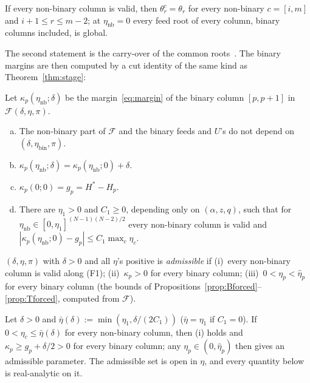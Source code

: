 \documentclass[11pt,a4paper]{report}
\newcommand{\cF}{\mathcal F}
\newcommand{\Hs}{H^{*}}
\begin{document}
\begin{lemma}\label{lem:middle}
If every non-binary column is valid, then \(\theta^c_r=\theta_r\) for every non-binary \(c=[i,m]\) and \(i+1\le r\le m-2\); at
\(\eta_{\mathrm{nb}}=0\) every feed root of every column, binary columns included, is global.
\end{lemma}

The second statement is the carry-over of the common roots~\autocite{CW89,HS2}. The binary margins are then computed by
a cut identity of the same kind as Theorem~\ref{thm:stage}:

\begin{proposition}\label{prop:margins}
Let \(\kappa_p(\eta_{\mathrm{nb}};\delta)\) be the margin~\eqref{eq:margin} of the binary column \([p,p+1]\) in \(\cF(\delta,\eta,\pi)\).
\begin{enumerate}[(a)]
\item The non-binary part of \(\cF\) and the binary feeds and \(U\)'s do not depend on \((\delta,\eta_{\mathrm{bin}},\pi)\).
\item \(\kappa_p(\eta_{\mathrm{nb}};\delta)=\kappa_p(\eta_{\mathrm{nb}};0)+\delta\).
\item \(\kappa_p(0;0)=g_p=\Hs-H_p\).
\item There are \(\eta_1>0\) and \(C_1\ge0\), depending only on \((\alpha,z,q)\), such that for
\(\eta_{\mathrm{nb}}\in[0,\eta_1]^{(N-1)(N-2)/2}\) every non-binary column is valid and \(|\kappa_p(\eta_{\mathrm{nb}};0)-g_p|\le
C_1\max_c\eta_c\).
\end{enumerate}
\end{proposition}

\begin{definition}\label{def:admissible}
\((\delta,\eta,\pi)\) with \(\delta>0\) and all \(\eta\)'s positive is \emph{admissible} if (i)~every non-binary column is valid
along (F1); (ii)~\(\kappa_p>0\) for every binary column; (iii)~\(0<\eta_p<\hat\eta_p\) for every binary column (the bounds of
Propositions~\ref{prop:Bforced}--\ref{prop:Tforced}, computed from \(\cF\)).
\end{definition}

\begin{theorem}\label{thm:admissible}
Let \(\delta>0\) and \(\bar\eta(\delta):=\min(\eta_1,\delta/(2C_1))\) (\(\bar\eta=\eta_1\) if \(C_1=0\)). If \(0<\eta_c\le\bar\eta(\delta)\) for
every non-binary column, then (i) holds and \(\kappa_p\ge g_p+\delta/2>0\) for every binary column; any \(\eta_p\in(0,\hat\eta_p)\)
then gives an admissible parameter. The admissible set is open in \(\eta\), and every quantity below is real-analytic on it.
\end{theorem}
\end{document}
